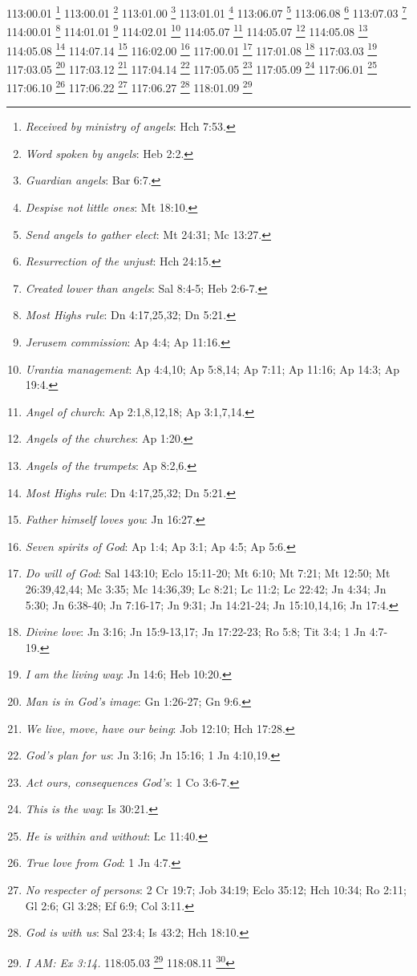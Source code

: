 {{113:00.01 \footnote{\textit{Received by ministry of angels}: Hch 7:53.}
113:00.01 \footnote{\textit{Word spoken by angels}: Heb 2:2.}
113:01.00 \footnote{\textit{Guardian angels}: Bar 6:7.}
113:01.01 \footnote{\textit{Despise not little ones}: Mt 18:10.}
113:06.07 \footnote{\textit{Send angels to gather elect}: Mt 24:31; Mc 13:27.}
113:06.08 \footnote{\textit{Resurrection of the unjust}: Hch 24:15.}
113:07.03 \footnote{\textit{Created lower than angels}: Sal 8:4-5; Heb 2:6-7.}
114:00.01 \footnote{\textit{Most Highs rule}: Dn 4:17,25,32; Dn 5:21.}
114:01.01 \footnote{\textit{Jerusem commission}: Ap 4:4; Ap 11:16.}
114:02.01 \footnote{\textit{Urantia management}: Ap 4:4,10; Ap 5:8,14; Ap 7:11; Ap 11:16; Ap 14:3; Ap 19:4.}
114:05.07 \footnote{\textit{Angel of church}: Ap 2:1,8,12,18; Ap 3:1,7,14.}
114:05.07 \footnote{\textit{Angels of the churches}: Ap 1:20.}
114:05.08 \footnote{\textit{Angels of the trumpets}: Ap 8:2,6.}
114:05.08 \footnote{\textit{Most Highs rule}: Dn 4:17,25,32; Dn 5:21.}
114:07.14 \footnote{\textit{Father himself loves you}: Jn 16:27.}
116:02.00 \footnote{\textit{Seven spirits of God}: Ap 1:4; Ap 3:1; Ap 4:5; Ap 5:6.}
117:00.01 \footnote{\textit{Do will of God}: Sal 143:10; Eclo 15:11-20; Mt 6:10; Mt 7:21; Mt 12:50; Mt 26:39,42,44; Mc 3:35; Mc 14:36,39; Lc 8:21; Lc 11:2; Lc 22:42; Jn 4:34; Jn 5:30; Jn 6:38-40; Jn 7:16-17; Jn 9:31; Jn 14:21-24; Jn 15:10,14,16; Jn 17:4.}
117:01.08 \footnote{\textit{Divine love}: Jn 3:16; Jn 15:9-13,17; Jn 17:22-23; Ro 5:8; Tit 3:4; 1 Jn 4:7-19.}
117:03.03 \footnote{\textit{I am the living way}: Jn 14:6; Heb 10:20.}
117:03.05 \footnote{\textit{Man is in God's image}: Gn 1:26-27; Gn 9:6.}
117:03.12 \footnote{\textit{We live, move, have our being}: Job 12:10; Hch 17:28.}
117:04.14 \footnote{\textit{God's plan for us}: Jn 3:16; Jn 15:16; 1 Jn 4:10,19.}
117:05.05 \footnote{\textit{Act ours, consequences God's}: 1 Co 3:6-7.}
117:05.09 \footnote{\textit{This is the way}: Is 30:21.}
117:06.01 \footnote{\textit{He is within and without}: Lc 11:40.}
117:06.10 \footnote{\textit{True love from God}: 1 Jn 4:7.}
117:06.22 \footnote{\textit{No respecter of persons}: 2 Cr 19:7; Job 34:19; Eclo 35:12; Hch 10:34; Ro 2:11; Gl 2:6; Gl 3:28; Ef 6:9; Col 3:11.}
117:06.27 \footnote{\textit{God is with us}: Sal 23:4; Is 43:2; Hch 18:10.}
118:01.09 \footnote{\textit{I AM: Ex 3:14.}
118:05.03 \footnote{\textit{God loves us first}: 1 Jn 4:10,19.}
118:08.11 \footnote{\textit{My will that your will be done}: Sal 143:10; Eclo 15:11-20; Mt 6:10; Mt 7:21; Mt 12:50; Mt 26:39,42,44; Mc 3:35; Mc 14:36,39; Lc 8:21; Lc 11:2; Lc 22:42; Jn 4:34; Jn 5:30; Jn 6:38-40; Jn 7:16-17; Jn 9:31; Jn 14:21-24; Jn 15:10,14; Jn 17:4.}
}}}
